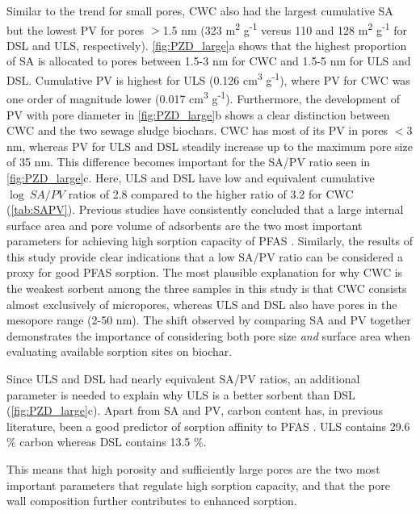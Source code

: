 Similar to the trend for small pores, CWC also had the largest cumulative SA but the lowest PV for pores $>$1.5 nm (323 m\textsuperscript{2} g\textsuperscript{-1} versus 110 and 128 m\textsuperscript{2} g\textsuperscript{-1} for DSL and ULS, respectively). \cref{fig:PZD_large}a shows that the highest proportion of SA is allocated to pores between 1.5-3 nm for CWC and 1.5-5 nm for ULS and DSL. Cumulative PV is highest for ULS (0.126 cm\textsuperscript{3} g\textsuperscript{-1}), where PV for CWC was one order of magnitude lower (0.017 cm\textsuperscript{3} g\textsuperscript{-1}). Furthermore, the development of PV with pore diameter in \cref{fig:PZD_large}b shows a clear distinction between CWC and the two sewage sludge biochars. CWC has most of its PV in pores $<$3 nm, whereas PV for ULS and DSL steadily increase up to the maximum pore size of 35 nm. This difference becomes important for the SA/PV ratio seen in \cref{fig:PZD_large}c. Here, ULS and DSL have low and equivalent cumulative $\log~SA/PV$ ratios of 2.8 compared to the higher ratio of 3.2 for CWC (\cref{tab:SAPV}). Previous studies have consistently concluded that a large internal surface area and pore volume of adsorbents are the two most important parameters for achieving high sorption capacity of PFAS \citep{du2014adsorption,Sormo2021,Hale2016,ahmed2020per}. Similarly, the results of this study provide clear indications that a low SA/PV ratio can be considered a proxy for good PFAS sorption. The most plausible explanation for why CWC is the weakest sorbent among the three samples in this study is that CWC consists almost exclusively of micropores, whereas ULS and DSL also have pores in the mesopore range (2-50 nm). The shift observed by comparing SA and PV together demonstrates the importance of considering both pore size \textit{and} surface area when evaluating available sorption sites on biochar.

Since ULS and DSL had nearly equivalent SA/PV ratios, an additional parameter is needed to explain why ULS is a better sorbent than DSL (\cref{fig:PZD_large}c). Apart from SA and PV, carbon content has, in previous literature, been a good predictor of sorption affinity to PFAS \citep{Hale2016,Cornelissen2005}. ULS contains 29.6 \% carbon whereas DSL contains 13.5 \%.  

This means that high porosity and sufficiently large pores are the two most important parameters that regulate high sorption capacity, and that the pore wall composition further contributes to enhanced sorption. 

